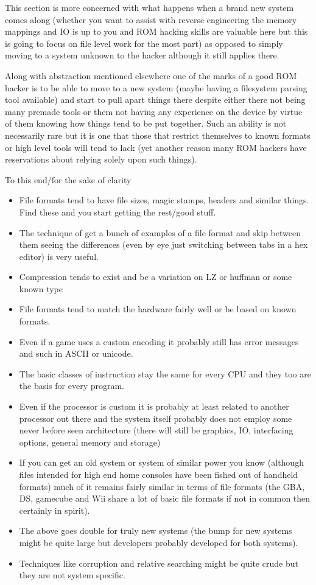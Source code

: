 \documentclass[
]{book}
\providecommand{\tightlist}{%
  \setlength{\itemsep}{0pt}\setlength{\parskip}{0pt}}
\begin{document}
This section is more concerned with what happens when a brand new system comes along (whether you want to assist with reverse engineering the memory mappings and IO is up to you and ROM hacking skills are valuable here but this is going to focus on file level work for the most part) as opposed to simply moving to a system unknown to the hacker although it still applies there.

Along with abstraction mentioned elsewhere one of the marks of a good ROM hacker is to be able to move to a new system (maybe having a filesystem parsing tool available) and start to pull apart things there despite either there not being many premade tools or them not having any experience on the device by virtue of them knowing how things tend to be put together. Such an ability is not necessarily rare but it is one that those that restrict themselves to known formats or high level tools will tend to lack (yet another reason many ROM hackers have reservations about relying solely upon such things).

To this end/for the sake of clarity

\begin{itemize}
\tightlist
\item
  File formats tend to have file sizes, magic stamps, headers and similar things. Find these and you start getting the rest/good stuff.
\item
  The technique of get a bunch of examples of a file format and skip between them seeing the differences (even by eye just switching between tabs in a hex editor) is very useful.
\item
  Compression tends to exist and be a variation on LZ or huffman or some known type
\item
  File formats tend to match the hardware fairly well or be based on known formats.
\item
  Even if a game uses a custom encoding it probably still has error messages and such in ASCII or unicode.
\item
  The basic classes of instruction stay the same for every CPU and they too are the basis for every program.
\item
  Even if the processor is custom it is probably at least related to another processor out there and the system itself probably does not employ some never before seen architecture (there will still be graphics, IO, interfacing options, general memory and storage)
\item
  If you can get an old system or system of similar power you know (although files intended for high end home consoles have been fished out of handheld formats) much of it remains fairly similar in terms of file formats (the GBA, DS, gamecube and Wii share a lot of basic file formats if not in common then certainly in spirit).
\item
  The above goes double for truly new systems (the bump for new systems might be quite large but developers probably developed for both systems).
\item
  Techniques like corruption and relative searching might be quite crude but they are not system specific.
\end{itemize}
\end{document}
